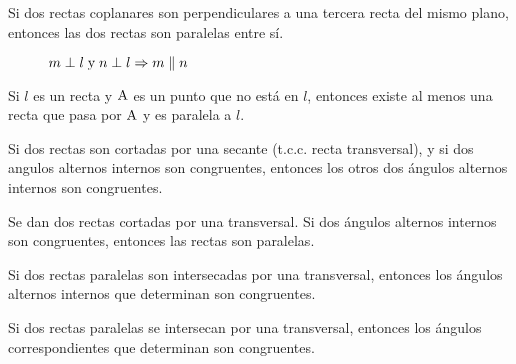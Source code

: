 \begin{theorem}
    Si dos rectas coplanares son perpendiculares a una tercera recta del mismo plano, entonces las dos rectas son paralelas entre sí.

    \begin{figure}[!h]
        \centering
        
        \caption{$m \perp l \;\text{y}\; n \perp l \Rightarrow m \parallel n$}
        \label{fig:theorem20}
    \end{figure}
    
\end{theorem}

\begin{theorem}
    Si $l$ es un recta y $\rm A$ es un punto que no está en $l$, entonces existe al menos una recta que pasa por $\rm A$ y es paralela a $l$.
\end{theorem}

\clearpage

\begin{theorem}
    Si dos rectas son cortadas por una secante (t.c.c. recta transversal), y si dos angulos alternos internos son congruentes, entonces los otros dos ángulos alternos internos son congruentes.
\end{theorem}

\begin{theorem}
    Se dan dos rectas cortadas por una transversal. Si dos ángulos alternos internos son congruentes, entonces las rectas son paralelas.
\end{theorem}

\begin{theorem}
    Si dos rectas paralelas son intersecadas por una transversal, entonces los ángulos alternos internos que determinan son congruentes.
\end{theorem}

\begin{figure}[!h]
    \centering
    
    \label{fig:theorem7}
\end{figure}

\begin{theorem}
    Si dos rectas paralelas se intersecan por una transversal, entonces los ángulos correspondientes que determinan son congruentes.
\end{theorem}

